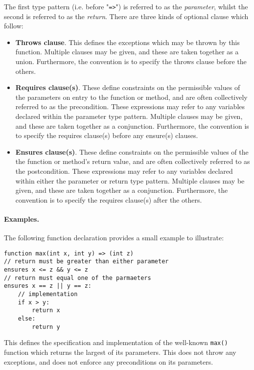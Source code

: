 The first type pattern (i.e. before "\lstinline{=>}") is referred to
as the {\em parameter}, whilst the second is referred to as the {\em
  return}.  There are three kinds of optional clause which follow:

\begin{itemize}
\item {\bf Throws clause}. This defines the exceptions which may be
  thrown by this function. Multiple clauses may be given, and these
  are taken together as a union. Furthermore, the convention is to
  specify the throws clause before the others.

\item {\bf Requires clause(s)}. These define constraints on the
  permissible values of the parameters on entry to the function or
  method, and are often collectively referred to as the
  \gls{precondition}. These expressions may refer to any variables
  declared within the parameter type pattern. Multiple clauses may be
  given, and these are taken together as a conjunction. Furthermore,
  the convention is to specify the requires clause(s) before any
  ensure(s) clauses.

\item {\bf Ensures clause(s)}. These define constraints on the
  permissible values of the the function or method's return value, and
  are often collectively referred to as the \gls{postcondition}. These
  expressions may refer to any variables declared within either the
  parameter or return type pattern.  Multiple clauses may be given,
  and these are taken together as a conjunction. Furthermore, the
  convention is to specify the requires clause(s) after the others.
\end{itemize}

\paragraph{Examples.}
The following function declaration provides a small example to
illustrate:

\begin{lstlisting}
function max(int x, int y) => (int z)
// return must be greater than either parameter
ensures x <= z && y <= z
// return must equal one of the parmaeters
ensures x == z || y == z:
    // implementation
    if x > y:
        return x
    else:
        return y
\end{lstlisting}

This defines the specification and implementation of the well-known
\lstinline{max()} function which returns the largest of its
parameters. This does not throw any exceptions, and does not enforce
any preconditions on its parameters.

